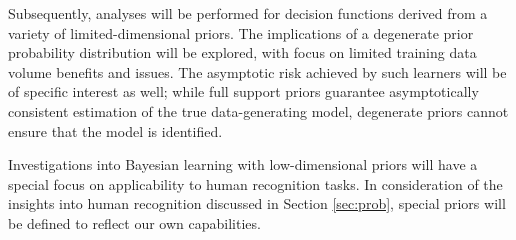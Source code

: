 \documentclass[12pt]{article}
\begin{document}
Subsequently, analyses will be performed for decision functions derived from a variety of limited-dimensional priors. The implications of a degenerate prior probability distribution will be explored, with focus on limited training data volume benefits and issues. The asymptotic risk achieved by such learners will be of specific interest as well; while full support priors guarantee asymptotically consistent estimation of the true data-generating model, degenerate priors cannot ensure that the model is identified. 

Investigations into Bayesian learning with low-dimensional priors will have a special focus on applicability to human recognition tasks. In consideration of the insights into human recognition discussed in Section \ref{sec:prob}, special priors will be defined to reflect our own capabilities. 
\end{document}
